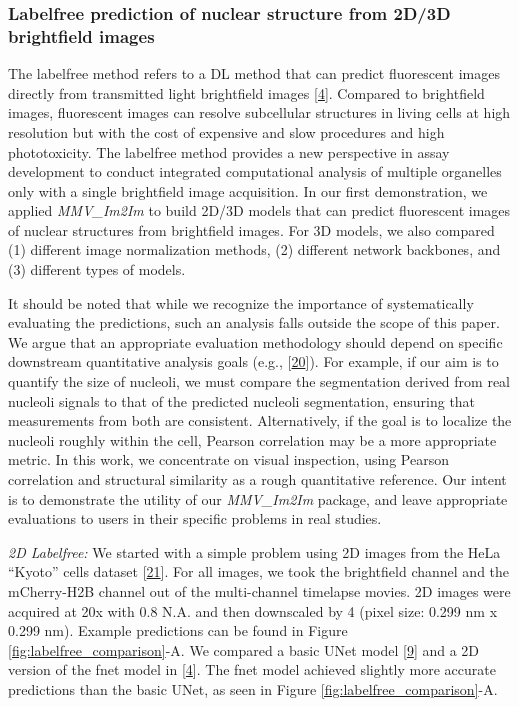 \hypertarget{labelfree-prediction-of-nuclear-structure-from-2d3d-brightfield-images}{%
\subsubsection{Labelfree prediction of nuclear structure from 2D/3D brightfield images}\label{labelfree-prediction-of-nuclear-structure-from-2d3d-brightfield-images}}

The labelfree method refers to a DL method that can predict fluorescent images directly from transmitted light brightfield images {[}\protect\hyperlink{ref-Yq8wZ6hc}{4}{]}. Compared to brightfield images, fluorescent images can resolve subcellular structures in living cells at high resolution but with the cost of expensive and slow procedures and high phototoxicity. The labelfree method provides a new perspective in assay development to conduct integrated computational analysis of multiple organelles only with a single brightfield image acquisition. In our first demonstration, we applied \emph{MMV\_Im2Im} to build 2D/3D models that can predict fluorescent images of nuclear structures from brightfield images. For 3D models, we also compared (1) different image normalization methods, (2) different network backbones, and (3) different types of models.

It should be noted that while we recognize the importance of systematically evaluating the predictions, such an analysis falls outside the scope of this paper. We argue that an appropriate evaluation methodology should depend on specific downstream quantitative analysis goals (e.g., {[}\protect\hyperlink{ref-C2iqR6xE}{20}{]}). For example, if our aim is to quantify the size of nucleoli, we must compare the segmentation derived from real nucleoli signals to that of the predicted nucleoli segmentation, ensuring that measurements from both are consistent. Alternatively, if the goal is to localize the nucleoli roughly within the cell, Pearson correlation may be a more appropriate metric. In this work, we concentrate on visual inspection, using Pearson correlation and structural similarity as a rough quantitative reference. Our intent is to demonstrate the utility of our \emph{MMV\_Im2Im} package, and leave appropriate evaluations to users in their specific problems in real studies.

\emph{2D Labelfree:} We started with a simple problem using 2D images from the HeLa ``Kyoto'' cells dataset {[}\protect\hyperlink{ref-xv2VIyRP}{21}{]}. For all images, we took the brightfield channel and the mCherry-H2B channel out of the multi-channel timelapse movies. 2D images were acquired at 20x with 0.8 N.A. and then downscaled by 4 (pixel size: 0.299 nm x 0.299 nm). Example predictions can be found in Figure \ref{fig:labelfree_comparison}-A. We compared a basic UNet model {[}\protect\hyperlink{ref-TutLhFSz}{9}{]} and a 2D version of the fnet model in {[}\protect\hyperlink{ref-Yq8wZ6hc}{4}{]}. The fnet model achieved slightly more accurate predictions than the basic UNet, as seen in Figure \ref{fig:labelfree_comparison}-A.

